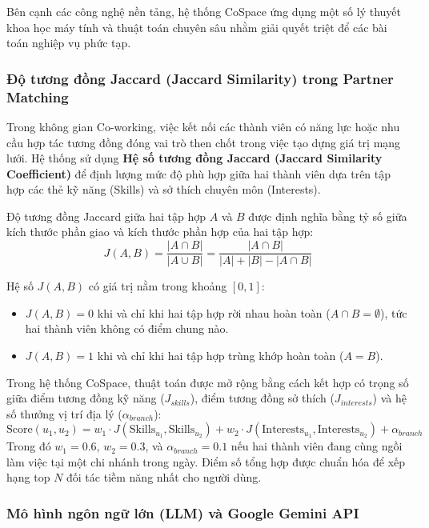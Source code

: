 Bên cạnh các công nghệ nền tảng, hệ thống CoSpace ứng dụng một số lý thuyết khoa học máy tính và thuật toán chuyên sâu nhằm giải quyết triệt để các bài toán nghiệp vụ phức tạp.

\subsubsection{Độ tương đồng Jaccard (Jaccard Similarity) trong Partner Matching}

Trong không gian Co-working, việc kết nối các thành viên có năng lực hoặc nhu cầu hợp tác tương đồng đóng vai trò then chốt trong việc tạo dựng giá trị mạng lưới. Hệ thống sử dụng \textbf{Hệ số tương đồng Jaccard (Jaccard Similarity Coefficient)} để định lượng mức độ phù hợp giữa hai thành viên dựa trên tập hợp các thẻ kỹ năng (Skills) và sở thích chuyên môn (Interests).

Độ tương đồng Jaccard giữa hai tập hợp $A$ và $B$ được định nghĩa bằng tỷ số giữa kích thước phần giao và kích thước phần hợp của hai tập hợp:
\begin{equation}
    J(A, B) = \frac{|A \cap B|}{|A \cup B|} = \frac{|A \cap B|}{|A| + |B| - |A \cap B|}
\end{equation}

Hệ số $J(A, B)$ có giá trị nằm trong khoảng $[0, 1]$:
\begin{itemize}
    \item $J(A, B) = 0$ khi và chỉ khi hai tập hợp rời nhau hoàn toàn ($A \cap B = \emptyset$), tức hai thành viên không có điểm chung nào.
    \item $J(A, B) = 1$ khi và chỉ khi hai tập hợp trùng khớp hoàn toàn ($A = B$).
\end{itemize}

Trong hệ thống CoSpace, thuật toán được mở rộng bằng cách kết hợp có trọng số giữa điểm tương đồng kỹ năng ($J_{skills}$), điểm tương đồng sở thích ($J_{interests}$) và hệ số thưởng vị trí địa lý ($\alpha_{branch}$):
\begin{equation}
    \text{Score}(u_1, u_2) = w_1 \cdot J(\text{Skills}_{u_1}, \text{Skills}_{u_2}) + w_2 \cdot J(\text{Interests}_{u_1}, \text{Interests}_{u_2}) + \alpha_{branch}
\end{equation}
Trong đó $w_1 = 0.6$, $w_2 = 0.3$, và $\alpha_{branch} = 0.1$ nếu hai thành viên đang cùng ngồi làm việc tại một chi nhánh trong ngày. Điểm số tổng hợp được chuẩn hóa để xếp hạng top $N$ đối tác tiềm năng nhất cho người dùng.

\subsubsection{Mô hình ngôn ngữ lớn (LLM) và Google Gemini API}

